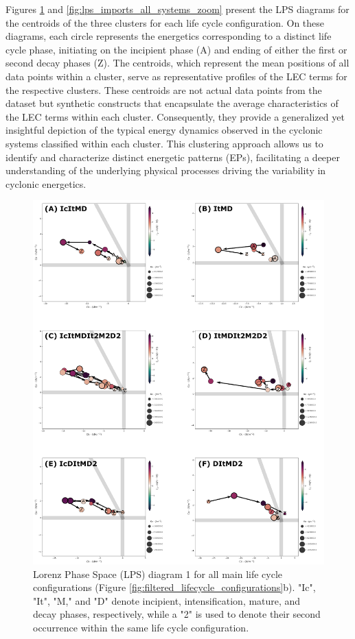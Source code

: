 Figures \ref{fig:lps_mixed_clusters_all_life_cycles} and \ref{fig:lps_imports_all_systems_zoom} present the LPS diagrams for the centroids of the three clusters for each life cycle configuration. On these diagrams, each circle represents the energetics corresponding to a distinct life cycle phase, initiating on the incipient phase (A) and ending of either the first or second decay phases (Z). The centroids, which represent the mean positions of all data points within a cluster, serve as representative profiles of the LEC terms for the respective clusters. These centroids are not actual data points from the dataset but synthetic constructs that encapsulate the average characteristics of the LEC terms within each cluster. Consequently, they provide a generalized yet insightful depiction of the typical energy dynamics observed in the cyclonic systems classified within each cluster. This clustering approach allows us to identify and characterize distinct energetic patterns (EPs), facilitating a deeper understanding of the underlying physical processes driving the variability in cyclonic energetics.

\begin{figure}[!htbp]
\centering
\includegraphics[width=\textwidth]{figs_6/lps_mixed_clusters_all_life_cycles.pdf}
\caption[LPS 1 - Clusters - All Life Cycle Configurations]{Lorenz Phase Space (LPS) diagram 1 for all main life cycle configurations (Figure \ref{fig:filtered_lifecycle_configurations}b). "Ic", "It", "M," and "D" denote incipient, intensification, mature, and decay phases, respectively, while a "2" is used to denote their second occurrence within the same life cycle configuration.}
\label{fig:lps_mixed_clusters_all_life_cycles}
\end{figure}

